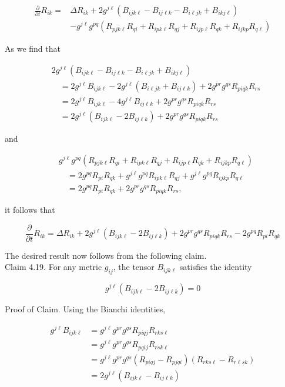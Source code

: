 \documentclass[10pt, letterpaper]{article}
\begin{document}
$$
\begin{aligned}
\frac{\partial}{\partial t} R_{i k}= & \Delta R_{i k}+2 g^{j \ell}\left(B_{i j k \ell}-B_{i j \ell k}-B_{i \ell j k}+B_{i k j \ell}\right) \\
& -g^{j \ell} g^{p q}\left(R_{p j k \ell} R_{q i}+R_{i p k \ell} R_{q j}+R_{i j p \ell} R_{q k}+R_{i j k p} R_{q \ell}\right)
\end{aligned}
$$

As we find that

$$
\begin{aligned}
& 2 g^{j \ell}\left(B_{i j k \ell}-B_{i j \ell k}-B_{i \ell j k}+B_{i k j \ell}\right) \\
& \quad=2 g^{j \ell} B_{i j k \ell}-2 g^{j \ell}\left(B_{i \ell j k}+B_{i j \ell k}\right)+2 g^{p r} g^{q s} R_{p i q k} R_{r s} \\
& \quad=2 g^{j \ell} B_{i j k \ell}-4 g^{j \ell} B_{i j \ell k}+2 g^{p r} g^{q s} R_{p i q k} R_{r s} \\
& \quad=2 g^{j \ell}\left(B_{i j k \ell}-2 B_{i j \ell k}\right)+2 g^{p r} g^{q s} R_{p i q k} R_{r s}
\end{aligned}
$$

and

$$
\begin{aligned}
& g^{j \ell} g^{p q}\left(R_{p j k \ell} R_{q i}+R_{i p k \ell} R_{q j}+R_{i j p \ell} R_{q k}+R_{i j k p} R_{q \ell}\right) \\
& \quad=2 g^{p q} R_{p i} R_{q k}+g^{j \ell} g^{p q} R_{i p k \ell} R_{q j}+g^{j \ell} g^{p q} R_{i j k p} R_{q \ell} \\
& \quad=2 g^{p q} R_{p i} R_{q k}+2 g^{p r} g^{q s} R_{p i q k} R_{r s},
\end{aligned}
$$

it follows that

$$
\frac{\partial}{\partial t} R_{i k}=\Delta R_{i k}+2 g^{j \ell}\left(B_{i j k \ell}-2 B_{i j \ell k}\right)+2 g^{p r} g^{q s} R_{p i q k} R_{r s}-2 g^{p q} R_{p i} R_{q k}
$$

The desired result now follows from the following claim.\\
Claim 4.19. For any metric $g_{i j}$, the tensor $B_{i j k \ell}$ satisfies the identity

$$
g^{j \ell}\left(B_{i j k \ell}-2 B_{i j \ell k}\right)=0
$$

Proof of Claim. Using the Bianchi identities,

$$
\begin{aligned}
g^{j \ell} B_{i j k \ell} & =g^{j \ell} g^{p r} g^{q s} R_{p i q j} R_{r k s \ell} \\
& =g^{j \ell} g^{p r} g^{q s} R_{p q i j} R_{r s k \ell} \\
& =g^{j \ell} g^{p r} g^{q s}\left(R_{p i q j}-R_{p j q i}\right)\left(R_{r k s \ell}-R_{r \ell s k}\right) \\
& =2 g^{j \ell}\left(B_{i j k \ell}-B_{i j \ell k}\right)
\end{aligned}
$$
\end{document}
